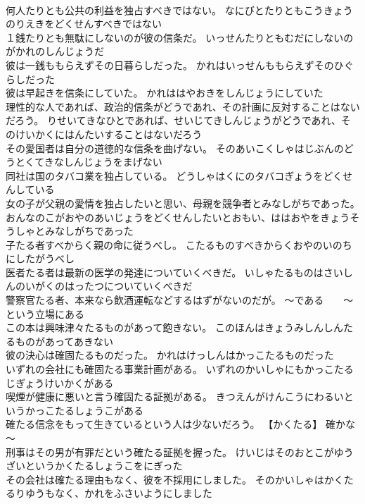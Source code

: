 \documentclass[8pt]{extreport}
\begin{document}
\begin{CJK}{UTF8}{min}
\\	何人たりとも公共の利益を独占すべきではない。	なにびとたりともこうきょうのりえきをどくせんすべきではない 
\\	１銭たりとも無駄にしないのが彼の信条だ。	いっせんたりともむだにしないのがかれのしんじょうだ 
\\	彼は一銭ももらえずその日暮らしだった。	かれはいっせんももらえずそのひぐらしだった 
\\	彼は早起きを信条にしていた。	かれははやおきをしんじょうにしていた 
\\	理性的な人であれば、政治的信条がどうであれ、その計画に反対することはないだろう。	りせいてきなひとであれば、せいじてきしんじょうがどうであれ、そのけいかくにはんたいすることはないだろう 
\\	その愛国者は自分の道徳的な信条を曲げない。	そのあいこくしゃはじぶんのどうとくてきなしんじょうをまげない 
\\	同社は国のタバコ業を独占している。	どうしゃはくにのタバコぎょうをどくせんしている 
\\	女の子が父親の愛情を独占したいと思い、母親を競争者とみなしがちであった。	おんなのこがおやのあいじょうをどくせんしたいとおもい、ははおやをきょうそうしゃとみなしがちであった 
\\	子たる者すべからく親の命に従うべし。	こたるものすべきからくおやのいのちにしたがうべし 
\\	医者たる者は最新の医学の発達についていくべきだ。	いしゃたるものはさいしんのいがくのはったつについていくべきだ 
\\	警察官たる者、本来なら飲酒運転などするはずがないのだが。	～である　　～という立場にある
\\	この本は興味津々たるものがあって飽きない。	このほんはきょうみしんしんたるものがあってあきない 
\\	彼の決心は確固たるものだった。	かれはけっしんはかっこたるものだった 
\\	いずれの会社にも確固たる事業計画がある。	いずれのかいしゃにもかっこたるじぎょうけいかくがある 
\\	喫煙が健康に悪いと言う確固たる証拠がある。	きつえんがけんこうにわるいというかっこたるしょうこがある 
\\	確たる信念をもって生きているという人は少ないだろう。	【かくたる】 確かな～
\\	刑事はその男が有罪だという確たる証拠を握った。	けいじはそのおとこがゆうざいというかくたるしょうこをにぎった 
\\	その会社は確たる理由もなく、彼を不採用にしました。	そのかいしゃはかくたるりゆうもなく、かれをふさいようにしました 

\end{CJK}
\end{document}
